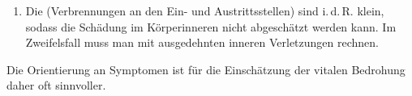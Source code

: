 {\begin{enumerate}
{  Stromes hängt jedoch auch vom elektrischen Widerstand des durchströmten
  Materials ab.}, Stärke des elektrischen Stromes\footnote{Die Stärke des
  elektrischen Stromes wird in Ampere (A) gemessen.}, der
  Stromart (Gleich- oder Wechselstrom), dem Weg des Stromes
  durch den Körper, dem Kontaktwiderstand (feuchte Hände,
  Wasserlacke, \ldots) und der Einwirkzeit. Meistens sind
  die Zahlenwerte dieser Faktoren im Einsatzfall jedoch
  nicht bekannt, sodass eine theoretische Abschätzung der
  Gefährung praktisch nicht durchführbar ist. 
  \item Die  (Verbrennungen an den Ein- und
  Austrittsstellen) sind i.\,d.\,R. klein, sodass die Schädung im Körperinneren nicht abgeschätzt
  werden kann. Im Zweifelsfall muss man mit ausgedehnten inneren Verletzungen
  rechnen.
\end{enumerate}
Die Orientierung an Symptomen ist für die Einschätzung der vitalen Bedrohung
daher oft sinnvoller.
}%


